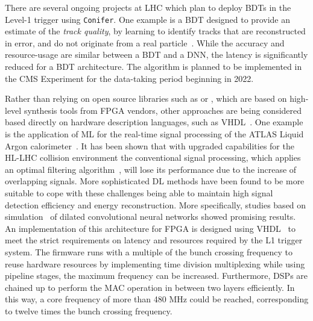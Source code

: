 There are several ongoing projects at LHC which plan to deploy BDTs in the Level-1 trigger using {\tt Conifer}. One example is a BDT designed to provide an estimate of the {\em track quality}, by learning to identify tracks that are reconstructed in error, and do not originate from a real particle~\cite{bdt_tq}. 
While the accuracy and resource-usage are similar between a BDT and a DNN, the latency is significantly reduced for a BDT architecture. 
The algorithm is planned to be implemented in the CMS Experiment for the data-taking period beginning in 2022.

Rather than relying on open source libraries such as \hlsfml or \conifer, which are based on high-level synthesis tools from FPGA vendors, other approaches are being considered based directly on hardware description languages, such as VHDL~\cite{Nottbeck:2019rqu,Fritzsche2020}. 
One example is the application of ML for the real-time signal processing of the ATLAS Liquid Argon calorimeter~\cite{atlas1996atlas}. 
It has been shown that with upgraded capabilities for the HL-LHC collision environment the conventional signal processing, which applies an optimal filtering algorithm~\cite{Cleland:2002rya}, will lose its performance due to the increase of overlapping signals. 
More sophisticated DL methods have been found to be more suitable to cope with these challenges being able to maintain high signal detection efficiency and energy reconstruction. 
More specifically, studies based on simulation~\cite{madysa-chep} of dilated convolutional neural networks showed promising results. 
An implementation of this architecture for FPGA is designed using VHDL~\cite{Fritzsche2020} to meet the strict requirements on latency and resources required by the L1 trigger system. 
The firmware runs with a multiple of the bunch crossing frequency to reuse hardware resources by implementing time division multiplexing while using pipeline stages, the maximum frequency can be increased. 
Furthermore, DSPs are chained up to perform the MAC operation in between two layers efficiently. In this way, a core frequency of more than 480 MHz could be reached, corresponding to twelve times the bunch crossing frequency.

